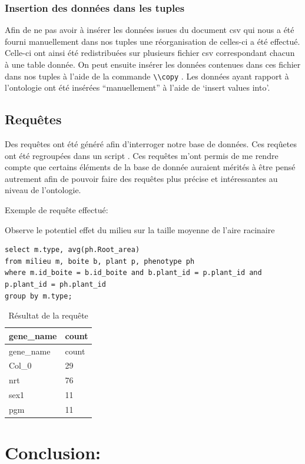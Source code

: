 \documentclass[11pt,french,]{article}
\begin{document}
\hypertarget{insertion-des-donnees-dans-les-tuples}{%
\subsubsection{Insertion des données dans les
tuples}\label{insertion-des-donnees-dans-les-tuples}}

Afin de ne pas avoir à insérer les données issues du document csv qui
nous a été fourni manuellement dans nos tuples une réorganisation de
celles-ci a été effectué. Celle-ci ont ainsi été redistribuées sur
plusieurs fichier csv correspondant chacun à une table donnée. On peut
ensuite insérer les données contenues dans ces fichier dans nos tuples à
l'aide de la commande \texttt{\textbackslash{}\textbackslash{}copy} .
Les données ayant rapport à l'ontologie ont été insérées
``manuellement'' à l'aide de `insert values into'.

\hypertarget{requetes}{%
\subsection{Requêtes}\label{requetes}}

Des requêtes ont été généré afin d'interroger notre base de données. Ces
reqûetes ont été regroupées dans un script . Ces requêtes m'ont permis
de me rendre compte que certains éléments de la base de donnée auraient
mérités à être pensé autrement afin de pouvoir faire des requêtes plus
précise et intéressantes au niveau de l'ontologie.

Exemple de requête effectué:

Observe le potentiel effet du milieu sur la taille moyenne de l'aire
racinaire

\begin{verbatim}
select m.type, avg(ph.Root_area)
from milieu m, boite b, plant p, phenotype ph
where m.id_boite = b.id_boite and b.plant_id = p.plant_id and p.plant_id = ph.plant_id
group by m.type;
\end{verbatim}

\begin{longtable}[]{@{}ll@{}}
\caption{Résultat de la requête}\tabularnewline
\toprule
gene\_name & count\tabularnewline
\midrule
\endfirsthead
\toprule
gene\_name & count\tabularnewline
\midrule
\endhead
Col\_0 & 29\tabularnewline
nrt & 76\tabularnewline
sex1 & 11\tabularnewline
pgm & 11\tabularnewline
\bottomrule
\end{longtable}

\hypertarget{conclusion}{%
\section{Conclusion:}\label{conclusion}}
\end{document}
